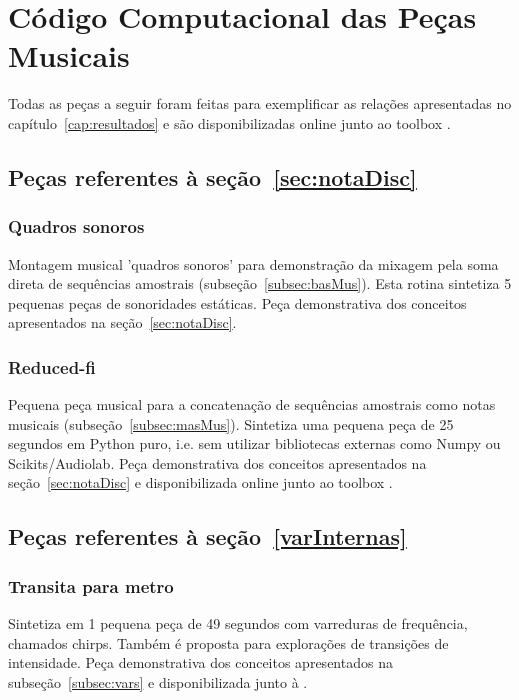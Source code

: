 \chapter{Código Computacional das Peças Musicais}
\label{cap:codigoPecas}
Todas as peças a seguir foram feitas para exemplificar as relações apresentadas no capítulo~\ref{cap:resultados} e são disponibilizadas online junto ao toolbox \massa.\cite{MASSA}

\section{Peças referentes à seção~\ref{sec:notaDisc}}

\subsection{Quadros sonoros}\label{ap:quadros}
Montagem musical 'quadros sonoros' para demonstração da mixagem pela soma direta de sequências amostrais (subseção~\ref{subsec:basMus}). Esta rotina sintetiza 5 pequenas peças de sonoridades estáticas. Peça demonstrativa dos conceitos apresentados na seção~\ref{sec:notaDisc}.

\clearpage

\subsection{Reduced-fi}\label{ap:reduced}
Pequena peça musical para a concatenação de sequências amostrais como notas musicais (subseção~\ref{subsec:masMus}). Sintetiza uma pequena peça de 25 segundos em Python puro, i.e. sem utilizar bibliotecas externas como Numpy ou Scikits/Audiolab. Peça demonstrativa dos conceitos apresentados na seção~\ref{sec:notaDisc} e disponibilizada online junto ao toolbox \massa.\cite{MASSA}


\clearpage
\section{Peças referentes à seção~\ref{varInternas}}

\subsection{Transita para metro}\label{ap:transita}
Sintetiza em 1 pequena peça de 49 segundos com varreduras de frequência, chamados chirps. Também é proposta para explorações de transições de intensidade. Peça demonstrativa dos conceitos apresentados na subseção~\ref{subsec:vars} e disponibilizada junto à \massa.\cite{MASSA}

